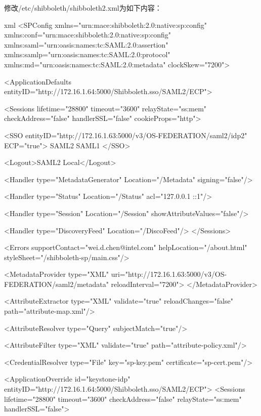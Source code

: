修改/etc/shibboleth/shibboleth2.xml为如下内容：
\begin{code-block}{xml}
<SPConfig xmlns="urn:mace:shibboleth:2.0:native:sp:config"
    xmlns:conf="urn:mace:shibboleth:2.0:native:sp:config"
    xmlns:saml="urn:oasis:names:tc:SAML:2.0:assertion"
    xmlns:samlp="urn:oasis:names:tc:SAML:2.0:protocol"
    xmlns:md="urn:oasis:names:tc:SAML:2.0:metadata"
    clockSkew="7200">

    <ApplicationDefaults entityID="http://172.16.1.64:5000/Shibboleth.sso/SAML2/ECP">

        <Sessions lifetime="28800" timeout="3600" relayState="ss:mem"
                  checkAddress="false" handlerSSL="false" cookieProps="http">

            <SSO entityID="http://172.16.1.63:5000/v3/OS-FEDERATION/saml2/idp2" ECP="true">
              SAML2 SAML1
            </SSO>

            <Logout>SAML2 Local</Logout>

            <Handler type="MetadataGenerator" Location="/Metadata" signing="false"/>

            <Handler type="Status" Location="/Status" acl="127.0.0.1 ::1"/>

            <Handler type="Session" Location="/Session" showAttributeValues="false"/>

            <Handler type="DiscoveryFeed" Location="/DiscoFeed"/>
        </Sessions>

        <Errors supportContact="wei.d.chen@intel.com"
            helpLocation="/about.html"
            styleSheet="/shibboleth-sp/main.css"/>

        <MetadataProvider type="XML" uri="http://172.16.1.63:5000/v3/OS-FEDERATION/saml2/metadata"
              reloadInterval="7200">
        </MetadataProvider>

        <AttributeExtractor type="XML" validate="true" reloadChanges="false" path="attribute-map.xml"/>

        <AttributeResolver type="Query" subjectMatch="true"/>

        <AttributeFilter type="XML" validate="true" path="attribute-policy.xml"/>

        <CredentialResolver type="File" key="sp-key.pem" certificate="sp-cert.pem"/>

        <ApplicationOverride id="keystone-idp" entityID="http://172.16.1.64:5000/Shibboleth.sso/SAML2/ECP">
           <Sessions lifetime="28800" timeout="3600" checkAddress="false"
           relayState="ss:mem" handlerSSL="false">


\end{code-block}
